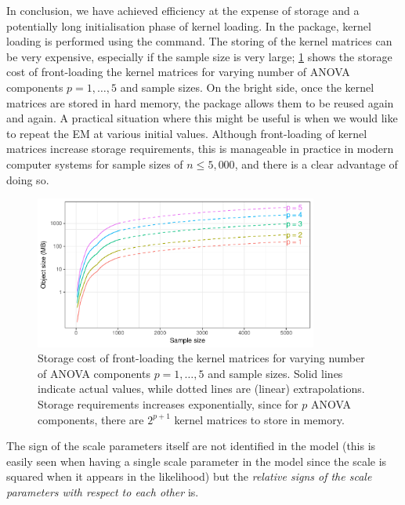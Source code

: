 In conclusion, we have achieved efficiency at the expense of storage and a potentially long initialisation phase of kernel loading.
In the  package, kernel loading is performed using the  command.
The storing of the kernel matrices can be very expensive, especially if the sample size is very large; \cref{fig:ipriorstorage} shows the storage cost of front-loading the kernel matrices for varying number of ANOVA components $p=1,\dots,5$ and sample sizes.
On the bright side, once the kernel matrices are stored in hard memory, the  package allows them to be reused again and again.
A practical situation where this might be useful is when we would like to repeat the EM at various initial values.
Although front-loading of kernel matrices increase storage requirements, this is manageable in practice in modern computer systems for sample sizes of $n \leq 5,000$, and there is a clear advantage of doing so.

\begin{figure}[htb]
  \centering
  \includegraphics[width=0.83\textwidth]{figure/04-iprior_size}
  \caption[Storage cost of front-loading the kernel matrices.]{Storage cost of front-loading the kernel matrices for varying number of ANOVA components $p=1,\dots,5$ and sample sizes. Solid lines indicate actual values, while dotted lines are (linear) extrapolations. Storage requirements increases exponentially, since for $p$ ANOVA components, there are $2^{p+1}$ kernel matrices to store in memory.}
  \label{fig:ipriorstorage}
\end{figure}

\begin{remark}
  The sign of the scale parameters itself are not identified in the model (this is easily seen when having a single scale parameter in the model since the scale is squared when it appears in the likelihood) but the \emph{relative signs of the scale parameters with respect to each other} is.
\end{remark}


